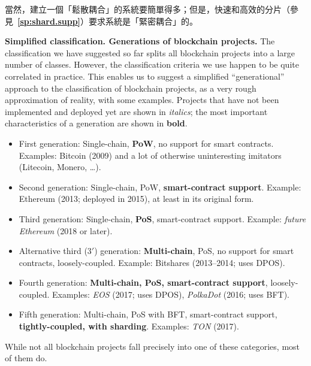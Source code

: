 \documentclass[12pt,oneside]{article}
\def\makepoint#1{\medbreak\noindent{\bf #1.\ }}
\def\nxsubpoint{\refstepcounter{subsubsection}%
  \smallbreak\makepoint{\thesubsubsection}}
\def\refpoint#1{{\rm\textbf{\ref{#1}}}}
\let\ptref=\refpoint
\def\embt(#1.){\textbf{#1.}}
\begin{document}
當然，建立一個「鬆散耦合」的系統要簡單得多；但是，快速和高效的分片（參見~\ptref{sp:shard.supp}）要求系統是「緊密耦合」的。

\nxsubpoint\label{sp:blkch.gen} \embt(Simplified
classification. Generations of blockchain projects.)  The
classification we have suggested so far splits all blockchain projects
into a large number of classes. However, the classification criteria
we use happen to be quite correlated in practice. This enables us to
suggest a simplified ``generational'' approach to the classification
of blockchain projects, as a very rough approximation of reality,
with some examples. Projects that have not been implemented and
deployed yet are shown in {\em italics}; the most important
characteristics of a generation are shown in {\bf bold}.
\begin{itemize}
\item First generation: Single-chain, {\bf PoW}, no support for smart
  contracts. Examples: Bitcoin (2009) and a lot of otherwise
  uninteresting imitators (Litecoin, Monero, \dots).
\item Second generation: Single-chain, PoW, {\bf smart-contract
  support}. Example: Ethereum (2013; deployed in 2015), at least in
  its original form.
\item Third generation: Single-chain, {\bf PoS}, smart-contract
  support. Example: {\em future Ethereum} (2018 or later).
\item Alternative third ($3'$) generation: {\bf Multi-chain}, PoS, no
  support for smart contracts, loosely-coupled. Example: Bitshares
  (2013--2014; uses DPOS).
\item Fourth generation: {\bf Multi-chain, PoS, smart-contract
  support}, loosely-coupled. Examples: {\em EOS\/} (2017; uses DPOS),
  {\em PolkaDot\/} (2016; uses BFT).
\item Fifth generation: Multi-chain, PoS with BFT, smart-contract
  support, {\bf tightly-coupled, with sharding}. Examples: {\em TON\/}
  (2017).
\end{itemize}
While not all blockchain projects fall precisely into one of these
categories, most of them do.
\end{document}
